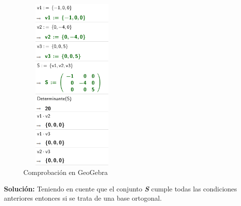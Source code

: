 \begin{figure}[ht!]
    \centering
    \includegraphics[width=150pt,height=250pt]{img/imagen11.png}
    \caption{Comprobación en GeoGebra}
\end{figure}
\textbf{Solución: }Teniendo en cuente que el conjunto \textbf{\textit{S}} cumple todas las condiciones anteriores entonces si se trata de una base ortogonal.
